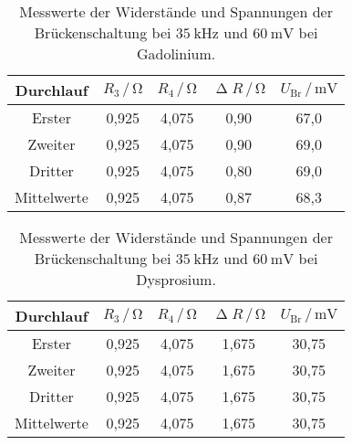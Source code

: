 \begin{table}[H]
  \centering
  \caption{Messwerte der Widerstände und Spannungen der Brückenschaltung bei $\SI{35}{\kilo\hertz}$ und $\SI{60}{\milli\volt}$ bei Gadolinium.}
  \label{tab:GdMessw}
  \begin{tabular}{c| c c c c}
    \toprule
    Durchlauf & $R_3 \,/\, \si{\ohm}$ & $R_4 \,/\, \si{\ohm}$ & $\upDelta R \,/\, \si{\ohm}$ & $U_{\text{Br}} \,/\, \si{\milli\volt}$ \\
    \midrule
    Erster & 0,925 & 4,075 & 0,90 & 67,0 \\
    Zweiter & 0,925 & 4,075 & 0,90 & 69,0 \\
    Dritter & 0,925 & 4,075 & 0,80 & 69,0 \\
    Mittelwerte & 0,925 & 4,075 & 0,87 & 68,3\\
    \bottomrule
  \end{tabular}
\end{table}

\begin{table}[H]
  \centering
  \caption{Messwerte der Widerstände und Spannungen der Brückenschaltung bei $\SI{35}{\kilo\hertz}$ und $\SI{60}{\milli\volt}$ bei Dysprosium.}
  \label{tab:DyMessw}
  \begin{tabular}{c| c c c c}
    \toprule
    Durchlauf & $R_3 \,/\, \si{\ohm}$ & $R_4 \,/\, \si{\ohm}$ & $\upDelta R \,/\, \si{\ohm}$ & $U_{\text{Br}} \,/\, \si{\milli\volt}$ \\
    \midrule
    Erster & 0,925 & 4,075 & 1,675 & 30,75 \\
    Zweiter & 0,925 & 4,075 & 1,675 & 30,75 \\
    Dritter & 0,925 & 4,075 & 1,675 & 30,75 \\
    Mittelwerte & 0,925 & 4,075 & 1,675 & 30,75 \\
    \bottomrule
  \end{tabular}
\end{table}

